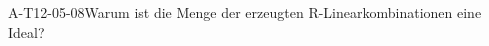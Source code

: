 
\begin{REM}{A-T12-05-08}{Warum ist die Menge der erzeugten R-Linearkombinationen eine Ideal?}
\end{REM}
